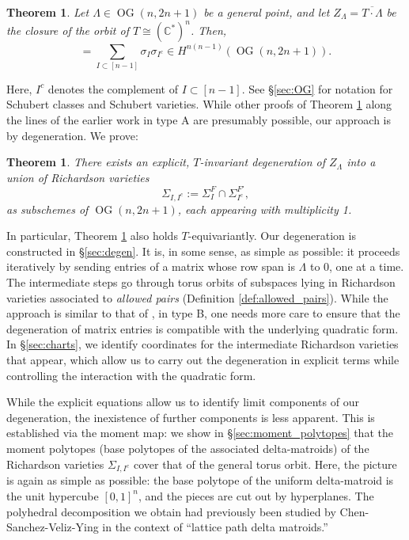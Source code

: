 \documentclass[12pt]{amsart}
\newtheorem{theorem}[definition]{Theorem}
\DeclareMathOperator{\OG}{OG}
\newcommand{\bC}{\mathbb{C}}
\begin{document}
\begin{theorem}\label{thm:class_formula}
    Let $\Lambda\in \OG(n,2n+1)$ be a general point, and let $Z_\Lambda=\overline{T\cdot \Lambda}$ be the closure of the orbit of $T\cong(\bC^{*})^n$. Then,
    \begin{equation*}
        [Z_\Lambda]=\sum_{I\subset[n-1]}\sigma_I\sigma_{I^c}\in H^{n(n-1)}(\OG(n,2n+1)).
    \end{equation*}
\end{theorem}
Here, $I^c$ denotes the complement of $I\subset[n-1]$. See \S\ref{sec:OG} for notation for Schubert classes and Schubert varieties. While other proofs of Theorem \ref{thm:class_formula} along the lines of the earlier work in type A are presumably possible, our approach is by degeneration. We prove:

\begin{theorem}\label{thm:degen}
There exists an explicit, $T$-invariant degeneration of $Z_\Lambda$ into a union of Richardson varieties
\begin{equation*}
    \Sigma_{I,I^c}:=\Sigma^F_I\cap \Sigma^{F'}_{I^c},
\end{equation*}
as subschemes of $\OG(n,2n+1)$, each appearing with multiplicity 1.
\end{theorem}
In particular, Theorem \ref{thm:class_formula} also holds $T$-equivariantly. Our degeneration is constructed in \S\ref{sec:degen}. It is, in some sense, as simple as possible: it proceeds iteratively by sending entries of a matrix whose row span is $\Lambda$ to 0, one at a time. The intermediate steps go through torus orbits of subspaces lying in Richardson varieties associated to \emph{allowed pairs} (Definition \ref{def:allowed_pairs}). While the approach is similar to that of \cite{lian_hhmp}, in type B, one needs more care to ensure that the degeneration of matrix entries is compatible with the underlying quadratic form. In \S\ref{sec:charts}, we identify coordinates for the intermediate Richardson varieties that appear, which allow us to carry out the degeneration in explicit terms while controlling the interaction with the quadratic form.

While the explicit equations allow us to identify limit components of our degeneration, the inexistence of further components is less apparent. This is established via the moment map: we show in \S\ref{sec:moment_polytopes} that the moment polytopes (base polytopes of the associated delta-matroids) of the Richardson varieties $\Sigma_{I,I^c}$ cover that of the general torus orbit. Here, the picture is again as simple as possible: the base polytope of the uniform delta-matroid is the unit hypercube $[0,1]^n$, and the pieces are cut out by hyperplanes. The polyhedral decomposition we obtain had previously been studied by Chen-Sanchez-Veliz-Ying \cite[Proposition 6.1]{csvy} in the context of ``lattice path delta matroids.''
\end{document}
